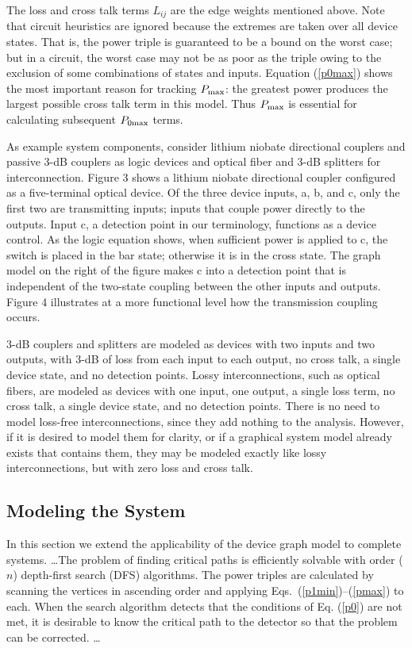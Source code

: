 The loss and cross talk terms $ L_{ij} $ are the edge weights mentioned
above.  Note that circuit heuristics are ignored because the extremes are
taken over all device states.  That is, the power triple is guaranteed to
be a bound on the worst case; but in a circuit, the worst case may not be
as poor as the triple owing to the exclusion of some combinations of states
and inputs.  Equation (\ref{p0max}) shows the most important reason for
tracking $P_{\rm max}$: the greatest power produces the largest possible
cross talk term in this model.  Thus $P_{\rm max}$ is essential for
calculating subsequent $ P_{0\rm max} $ terms.

As example system components, consider lithium niobate directional couplers
and passive 3-dB couplers as logic devices and optical fiber and 3-dB
splitters for interconnection.  Figure 3 shows a lithium niobate
directional coupler configured as a five-terminal optical device.\cite{6}
Of the three device inputs, a, b, and c, only the first two are
transmitting inputs; inputs that couple power directly to the outputs.
Input c, a detection point in our terminology, functions as a device
control.  As the logic equation shows, when sufficient power is applied to
c, the switch is placed in the bar state; otherwise it is in the cross
state.  The graph model on the right of the figure makes c into a detection
point that is independent of the two-state coupling between the other
inputs and outputs.  Figure 4 illustrates at a more functional level how
the transmission coupling occurs.


3-dB couplers and splitters are modeled as devices with two inputs and two
outputs, with 3-dB of loss from each input to each output, no cross talk, a
single device state, and no detection points.  Lossy interconnections, such
as optical fibers, are modeled as devices with one input, one output, a
single loss term, no cross talk, a single device state, and no detection
points.  There is no need to model loss-free interconnections, since they
add nothing to the analysis. However, if it is desired to model them for
clarity, or if a graphical system model already exists that contains them,
they may be modeled exactly like lossy interconnections, but with zero loss
and cross talk.

\subsection{ Modeling the System}
In this section we extend the applicability of the device graph model to
complete systems.  \ldots The problem of finding critical paths is
efficiently solvable with order ($n$) depth-first search (DFS)
algorithms.\cite{9} The power triples are calculated by scanning the
vertices in ascending order and applying Eqs.\ (\ref{p1min})--(\ref{pmax})
to each.  When the search algorithm detects that the conditions of Eq.
(\ref{p0}) are not met, it is desirable to know the critical path to the
detector so that the problem can be corrected. \ldots

